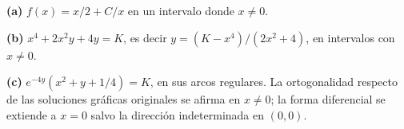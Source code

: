 \noindent\textbf{(a)} $f(x)=x/2+C/x$ en un intervalo donde $x\ne0$.

\noindent\textbf{(b)} $x^4+2x^2y+4y=K$, es decir $y=(K-x^4)/(2x^2+4)$, en intervalos con $x\ne0$.

\noindent\textbf{(c)} $e^{-4y}(x^2+y+1/4)=K$, en sus arcos regulares. La ortogonalidad respecto de las soluciones gráficas originales se afirma en $x\ne0$; la forma diferencial se extiende a $x=0$ salvo la dirección indeterminada en $(0,0)$.
